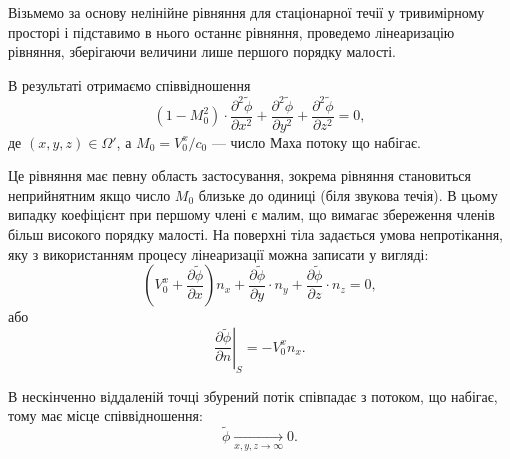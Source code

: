 Візьмемо за основу нелінійне рівняння для стаціонарної течії у тривимірному просторі і підставимо в нього останнє рівняння, проведемо лінеаризацію рівняння, зберігаючи величини лише першого порядку малості. \medskip

В результаті отримаємо співвідношення
\begin{equation}
	(1 - M_0^2) \cdot \frac{\partial^2 \tilde \phi}{\partial x^2} + \frac{\partial^2 \tilde \phi}{\partial y^2} + \frac{\partial^2 \tilde \phi}{\partial z^2} = 0,
\end{equation}
де $(x, y, z) \in \Omega'$, а $M_0 = V_0^x / c_0$ --- число Маха потоку що набігає.  \medskip

Це рівняння має певну область застосування, зокрема рівняння становиться неприйнятним якщо число $M_0$ близьке до одиниці (біля звукова течія). В цьому випадку коефіцієнт при першому члені є малим, що вимагає збереження членів більш високого порядку малості. На поверхні тіла задається умова непротікання, яку з використанням процесу лінеаризації можна записати у вигляді:
\begin{equation}
	\left( V_0^x + \frac{\partial \tilde \phi}{\partial x} \right) n_x + \frac{\partial \tilde \phi}{\partial y} \cdot n_y  + \frac{\partial \tilde \phi}{\partial z} \cdot n_z  = 0,
\end{equation}
або
\begin{equation}
	\left. \frac{\partial \tilde \phi}{\partial n} \right|_S = -V_0^x n_x.
\end{equation}

В нескінченно віддаленій точці збурений потік співпадає з потоком, що набігає, тому має місце співвідношення:
\begin{equation}
	\tilde \phi \xrightarrow[x, y, z \to \infty]{} 0.
\end{equation}

